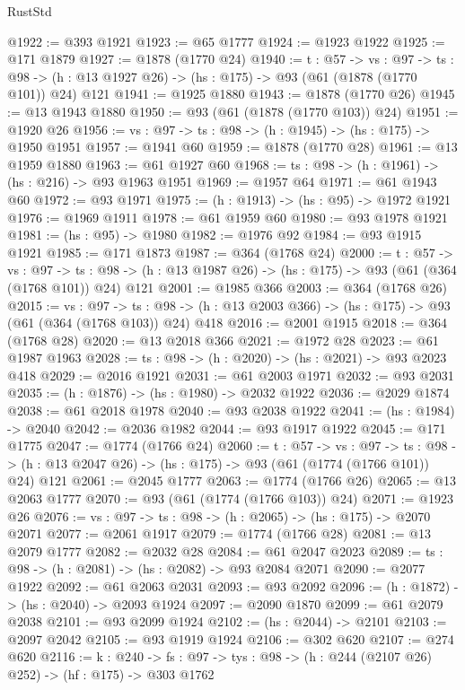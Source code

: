 \begin{lexlean}{RustStd}
\begin{coremodule}
@1922 := @393 @1921
@1923 := @65 @1777
@1924 := @1923 @1922
@1925 := @171 @1879
@1927 := @1878 (@1770 @24)
@1940 := {t : @57} ->
  {vs : @97} ->
  {ts : @98} -> (h : @13 @1927 @26) -> (hs : @175) -> @93 (@61 (@1878 (@1770 @101)) @24) @121
@1941 := @1925 @1880
@1943 := @1878 (@1770 @26)
@1945 := @13 @1943 @1880
@1950 := @93 (@61 (@1878 (@1770 @103)) @24)
@1951 := @1920 @26
@1956 := {vs : @97} -> {ts : @98} -> (h : @1945) -> (hs : @175) -> @1950 @1951
@1957 := @1941 @60
@1959 := @1878 (@1770 @28)
@1961 := @13 @1959 @1880
@1963 := @61 @1927 @60
@1968 := {ts : @98} -> (h : @1961) -> (hs : @216) -> @93 @1963 @1951
@1969 := @1957 @64
@1971 := @61 @1943 @60
@1972 := @93 @1971
@1975 := (h : @1913) -> (hs : @95) -> @1972 @1921
@1976 := @1969 @1911
@1978 := @61 @1959 @60
@1980 := @93 @1978 @1921
@1981 := (hs : @95) -> @1980
@1982 := @1976 @92
@1984 := @93 @1915 @1921
@1985 := @171 @1873
@1987 := @364 (@1768 @24)
@2000 := {t : @57} ->
  {vs : @97} ->
  {ts : @98} -> (h : @13 @1987 @26) -> (hs : @175) -> @93 (@61 (@364 (@1768 @101)) @24) @121
@2001 := @1985 @366
@2003 := @364 (@1768 @26)
@2015 := {vs : @97} ->
  {ts : @98} -> (h : @13 @2003 @366) -> (hs : @175) -> @93 (@61 (@364 (@1768 @103)) @24) @418
@2016 := @2001 @1915
@2018 := @364 (@1768 @28)
@2020 := @13 @2018 @366
@2021 := @1972 @28
@2023 := @61 @1987 @1963
@2028 := {ts : @98} -> (h : @2020) -> (hs : @2021) -> @93 @2023 @418
@2029 := @2016 @1921
@2031 := @61 @2003 @1971
@2032 := @93 @2031
@2035 := (h : @1876) -> (hs : @1980) -> @2032 @1922
@2036 := @2029 @1874
@2038 := @61 @2018 @1978
@2040 := @93 @2038 @1922
@2041 := (hs : @1984) -> @2040
@2042 := @2036 @1982
@2044 := @93 @1917 @1922
@2045 := @171 @1775
@2047 := @1774 (@1766 @24)
@2060 := {t : @57} ->
  {vs : @97} ->
  {ts : @98} -> (h : @13 @2047 @26) -> (hs : @175) -> @93 (@61 (@1774 (@1766 @101)) @24) @121
@2061 := @2045 @1777
@2063 := @1774 (@1766 @26)
@2065 := @13 @2063 @1777
@2070 := @93 (@61 (@1774 (@1766 @103)) @24)
@2071 := @1923 @26
@2076 := {vs : @97} -> {ts : @98} -> (h : @2065) -> (hs : @175) -> @2070 @2071
@2077 := @2061 @1917
@2079 := @1774 (@1766 @28)
@2081 := @13 @2079 @1777
@2082 := @2032 @28
@2084 := @61 @2047 @2023
@2089 := {ts : @98} -> (h : @2081) -> (hs : @2082) -> @93 @2084 @2071
@2090 := @2077 @1922
@2092 := @61 @2063 @2031
@2093 := @93 @2092
@2096 := (h : @1872) -> (hs : @2040) -> @2093 @1924
@2097 := @2090 @1870
@2099 := @61 @2079 @2038
@2101 := @93 @2099 @1924
@2102 := (hs : @2044) -> @2101
@2103 := @2097 @2042
@2105 := @93 @1919 @1924
@2106 := @302 @620
@2107 := @274 @620
@2116 := {k : @240} ->
  {fs : @97} -> {tys : @98} -> (h : @244 (@2107 @26) @252) -> (hf : @175) -> @303 @1762

\end{coremodule}
\end{lexlean}
